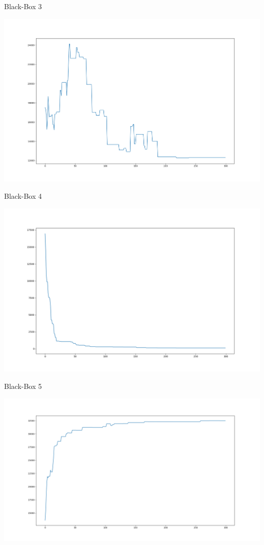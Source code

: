 \documentclass{ocbeameruni}
\begin{document}
\begin{frame}{Black-Box 3}
    \begin{center}
    \includegraphics[scale=0.3]{plots/bb3.png}
    \end{center}
\end{frame}

\begin{frame}{Black-Box 4}
    \begin{center}
    \includegraphics[scale=0.3]{plots/bb4.png}
    \end{center}
\end{frame}

\begin{frame}{Black-Box 5}
    \begin{center}
    \includegraphics[scale=0.25]{plots/bb5.png}
    \end{center}
\end{frame}
\end{document}
